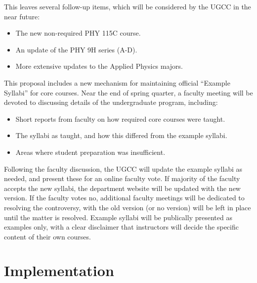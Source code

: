 \documentclass[12pt]{article}
\begin{document}
This leaves several follow-up items, which will be considered by the UGCC in the near future:
\begin{itemize}
 \item The new non-required PHY 115C course.
 \item An update of the PHY 9H series (A-D).
 \item More extensive updates to the Applied Physics majors.
\end{itemize}
This proposal includes a new mechanism for maintaining official
``Example Syllabi'' for core courses.  Near the end of spring quarter,
a faculty meeting will be devoted to discussing details of the
undergraduate program, including:
\begin{itemize} 
 \item Short reports from faculty on how required core courses were taught.
 \item The syllabi as taught, and how this differed from the example syllabi.
 \item Areas where student preparation was insufficient.
\end{itemize}
Following the faculty discussion, the UGCC will update the example
syllabi as needed, and present these for an online faculty vote.  If
majority of the faculty accepts the new syllabi, the department
website will be updated with the new version.  If the faculty votes
no, additional faculty meetings will be dedicated to resolving the
controversy, with the old version (or no version) will be left in
place until the matter is resolved.  Example syllabi will be
publically presented as examples only, with a clear disclaimer that
instructors will decide the specific content of their own courses.

\section{Implementation}
\label{sec:implementation}
\end{document}

